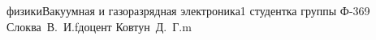 




    {физики}{Вакуумная и газоразрядная электроника}{}{1}
    {студентка группы Ф-369\\Слоква~В.~И.}{f}{доцент Ковтун~Д.~Г.}{m}
